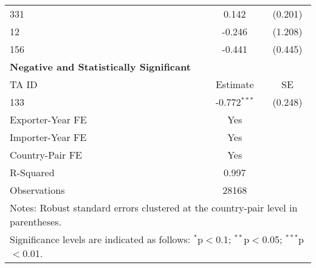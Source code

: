\begin{table}[htbp]
\begin{adjustbox}{max width=\textwidth}
\begin{tabular}{lcc}
    331 & 0.142 & (0.201) \\
    12  & -0.246 & (1.208) \\
    156 & -0.441 & (0.445) \\
    \hline
    \textbf{Negative and Statistically Significant} &  &  \\
    \hline
    TA ID & Estimate & SE \\
    \hline
    133 & -0.772$^{\ast\ast\ast}$ & (0.248) \\
    \hline
    Exporter-Year FE & Yes \\
    Importer-Year FE & Yes \\
    Country-Pair FE & Yes \\
    R-Squared & 0.997 \\
    Observations & 28168 \\
    \hline
    \multicolumn{3}{l}{\footnotesize{Notes: Robust standard errors clustered at the country-pair level in parentheses.}} \\
    \multicolumn{3}{l}{\footnotesize{Significance levels are indicated as follows: $^{\ast}$p$<$0.1; $^{\ast\ast}$p$<$0.05; $^{\ast\ast\ast}$p$<$0.01.}} \\
    \end{tabular}
    \end{adjustbox} 
\end{table}
